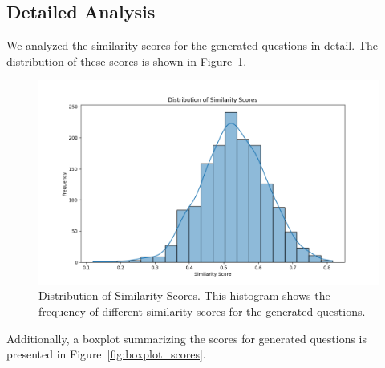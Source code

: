 \documentclass[fleqn,moreauthors,10pt]{ds_report}
\begin{document}


\subsection*{Detailed Analysis}
We analyzed the similarity scores for the generated questions in detail. The distribution of these scores is shown in Figure~\ref{fig:similarity_distribution}.
\begin{figure}[H]\centering
    \includegraphics[width=\linewidth]{sim_scores.png}
    \caption{Distribution of Similarity Scores. This histogram shows the frequency of different similarity scores for the generated questions.}
    \label{fig:similarity_distribution}
\end{figure}
Additionally, a boxplot summarizing the scores for generated questions is presented in Figure~\ref{fig:boxplot_scores}.
\end{document}
